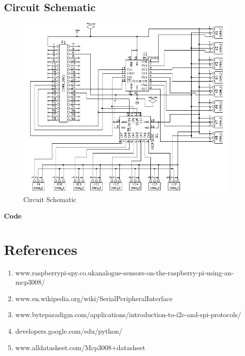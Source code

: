 \documentclass[11pt,a4paper]{article}
\begin{document}
  \subsection{Circuit Schematic}
        \begin{figure}[h!]
		\includegraphics[scale=0.6]{ckt_schematic2.jpg}
		\centering
        \caption{Circuit Schematic}
        \end{figure}

	\newpage 
	\textbf{Code}
	\vspace{0.3cm}
	
	

\section{References}
		\begin{enumerate}
			\item www.raspberrypi-spy.co.ukanalogue-sensors-on-the-raspberry-pi-using-an-mcp3008/
			\item www.en.wikipedia.org/wiki/SerialPeripheralInterface
			\item www.byteparadigm.com/applications/introduction-to-i2c-and-spi-protocols/
			\item developers.google.com/edu/python/
            \item www.alldatasheet.com/Mcp3008+datasheet
		\end{enumerate}	
\end{document}
